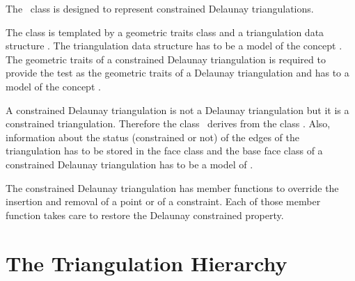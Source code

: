 The \cgal\ class
is designed to represent
constrained Delaunay triangulations.

The class is templated by a geometric traits class 
and a triangulation data structure .
The triangulation data structure has to be a model of the concept
.
 The geometric traits 
of a constrained Delaunay triangulation is required
to provide the  test as the geometric traits
of a Delaunay triangulation and has to a model of the concept
.

A constrained Delaunay triangulation is not a Delaunay
triangulation but it is a constrained triangulation.
Therefore the class \ccClassTemplateName\ derives from
the class .
Also, information about the status (constrained or not)
of the edges of the triangulation has to be stored
in the face class
 and the base face class
of a constrained Delaunay triangulation has to be a model
of .


The constrained Delaunay triangulation
has member functions to override the 
insertion and removal of a point or of a constraint.
Each of those member function takes care
to  restore
 the Delaunay constrained
property.





\section{The Triangulation Hierarchy}
\label{Section_2D_Triangulations_Hierarchy}


